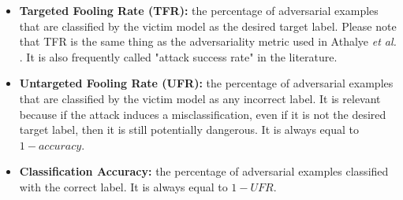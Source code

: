 \begin{itemize}
    \item \textbf{Targeted Fooling Rate (TFR):} the percentage of adversarial examples that are classified by the victim model as the desired target label. Please note that TFR is the same thing as the adversariality metric used in Athalye \textit{et al.} \cite{athalye}. It is also frequently called "attack success rate" in the literature.
    \item \textbf{Untargeted Fooling Rate (UFR):} the percentage of adversarial examples that are classified by the victim model as any incorrect label. It is relevant because if the attack induces a misclassification, even if it is not the desired target label, then it is still potentially dangerous.  It is always equal to $1 - accuracy$.
    \item \textbf{Classification Accuracy:} the percentage of adversarial examples classified with the correct label. It is always equal to $1 - UFR$.
\end{itemize}
